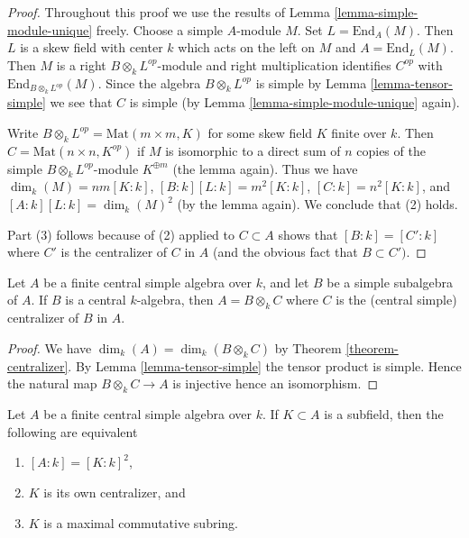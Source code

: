 \begin{proof}
Throughout this proof we use the results of
Lemma \ref{lemma-simple-module-unique} freely.
Choose a simple $A$-module $M$. Set $L = \text{End}_A(M)$.
Then $L$ is a skew field with center $k$ which acts on the left on $M$
and $A = \text{End}_L(M)$.
Then $M$ is a right $B \otimes_k L^{op}$-module and
right multiplication identifies $C^{op}$ with
$\text{End}_{B \otimes_k L^{op}}(M)$.
Since the algebra $B \otimes_k L^{op}$ is simple by
Lemma \ref{lemma-tensor-simple} we see that $C$ is simple (by
Lemma \ref{lemma-simple-module-unique} again).

\medskip\noindent
Write $B \otimes_k L^{op} = \text{Mat}(m \times m, K)$ for some
skew field $K$ finite over $k$. Then $C = \text{Mat}(n \times n, K^{op})$
if $M$ is isomorphic to a direct sum of $n$ copies of the simple
$B \otimes_k L^{op}$-module $K^{\oplus m}$ (the lemma again). Thus we have
$\dim_k(M) = nm [K : k]$, $[B : k] [L : k] = m^2 [K : k]$,
$[C : k] = n^2 [K : k]$, and $[A : k] [L : k] = \dim_k(M)^2$ (by
the lemma again). We conclude that (2) holds.

\medskip\noindent
Part (3) follows because of (2) applied to $C \subset A$ shows
that $[B : k] = [C' : k]$ where $C'$ is the centralizer of $C$ in $A$
(and the obvious fact that $B \subset C')$.
\end{proof}

\begin{lemma}
\label{lemma-when-tensor-is-equal}
Let $A$ be a finite central simple algebra over $k$, and let
$B$ be a simple subalgebra of $A$. If $B$ is a central
$k$-algebra, then $A = B \otimes_k C$ where $C$ is the (central simple)
centralizer of $B$ in $A$.
\end{lemma}

\begin{proof}
We have $\dim_k(A) = \dim_k(B \otimes_k C)$ by
Theorem \ref{theorem-centralizer}. By
Lemma \ref{lemma-tensor-simple}
the tensor product is simple. Hence the natural map
$B \otimes_k C \to A$ is injective hence an isomorphism.
\end{proof}

\begin{lemma}
\label{lemma-self-centralizing-subfield}
Let $A$ be a finite central simple algebra over $k$.
If $K \subset A$ is a subfield, then the following are equivalent
\begin{enumerate}
\item $[A : k] = [K : k]^2$,
\item $K$ is its own centralizer, and
\item $K$ is a maximal commutative subring.
\end{enumerate}
\end{lemma}

